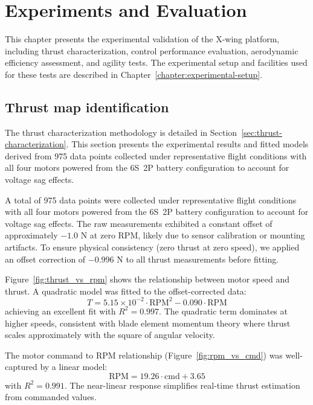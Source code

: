 
\chapter{Experiments and Evaluation}\label{chapter:experiments-evaluation}

This chapter presents the experimental validation of the X-wing platform, including thrust characterization, control performance evaluation, aerodynamic efficiency assessment, and agility tests. The experimental setup and facilities used for these tests are described in Chapter~\ref{chapter:experimental-setup}.

\section{Thrust map identification}
\label{sec:thrust_map_results}

The thrust characterization methodology is detailed in Section~\ref{sec:thrust-characterization}. This section presents the experimental results and fitted models derived from 975 data points collected under representative flight conditions with all four motors powered from the 6S~2P battery configuration to account for voltage sag effects.

A total of 975 data points were collected under representative flight conditions with all four motors powered from the 6S~2P battery configuration to account for voltage sag effects. The raw measurements exhibited a constant offset of approximately $-1.0$ N at zero RPM, likely due to sensor calibration or mounting artifacts. To ensure physical consistency (zero thrust at zero speed), we applied an offset correction of $-0.996$ N to all thrust measurements before fitting.

Figure~\ref{fig:thrust_vs_rpm} shows the relationship between motor speed and thrust. A quadratic model was fitted to the offset-corrected data:
\begin{equation}
T = 5.15 \times 10^{-2} \cdot \text{RPM}^2 - 0.090 \cdot \text{RPM}
\label{eq:thrust-rpm-fit}
\end{equation}
achieving an excellent fit with $R^2 = 0.997$. The quadratic term dominates at higher speeds, consistent with blade element momentum theory where thrust scales approximately with the square of angular velocity.

The motor command to RPM relationship (Figure~\ref{fig:rpm_vs_cmd}) was well-captured by a linear model:
\begin{equation}
\text{RPM} = 19.26 \cdot \text{cmd} + 3.65
\label{eq:rpm-cmd-fit}
\end{equation}
with $R^2 = 0.991$. The near-linear response simplifies real-time thrust estimation from commanded values.

